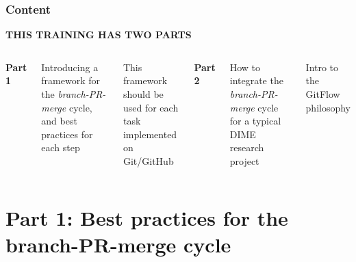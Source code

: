 \documentclass[aspectratio=169]{beamer} %
\begin{document}
\begin{frame}
	\frametitle{Content}

	\Large\centering \textbf{THIS TRAINING HAS TWO PARTS}
	
	\vspace{.8em}
	
	\begin{columns}[T]
		
		

		\centering 
		\large \textbf{Part 1}

		\vspace{1em}
		
		\raggedright
		\normalfont Introducing a framework for the \textit{branch-PR-merge} cycle,
		and best practices for each step
		
		\vspace{.5em}
		
		\normalfont This framework should be used for 
		each task implemented on Git/GitHub
		
		
		
		\centering 
		\large \textbf{Part 2}
		
		\vspace{1em}
		
		\raggedright
		\normalfont How to integrate the \textit{branch-PR-merge} cycle for a typical DIME research project
		
		\vspace{.5em}
		
		\normalfont Intro to the GitFlow philosophy
		
		
	\end{columns}
	
	\end{frame}



\section{Part 1: \newline Best practices for the branch-PR-merge cycle}
\end{document}
